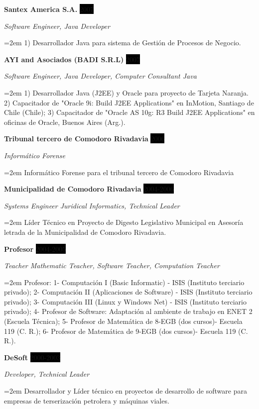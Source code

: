 \documentclass[paper=a4,fontsize=11pt]{scrartcl} %
\newcommand{\sepspace}{\vspace*{1em}}		%
\newcommand{\EducationEntry}[4]{
		\noindent \textbf{#1} \hfill      %
		\colorbox{Black}{%
			\parbox{6em}{%
			\hfill\color{White}#2}} \par  %
		\noindent \textit{#3} \par        %
		\noindent\hangindent=2em\hangafter=0 \small #4 %
		\normalsize \par}
\newcommand{\WorkEntry}[4]{				  %
		\noindent \textbf{#1} \hfill      %
		\colorbox{Black}{\color{White}#2} \par  %
		\noindent \textit{#3} \par              %
		\noindent\hangindent=2em\hangafter=0 \small #4 %
		\normalsize \par}
\begin{document}
\sepspace

\WorkEntry{Santex America S.A.}{2007}{Software Engineer, Java Developer}
{1) Desarrollador Java para sistema de Gestión de Procesos de Negocio.}

\sepspace

\WorkEntry{AYI and Asociados (BADI S.R.L)}{2007}{Software Engineer, Java Developer, Computer Consultant Java}
{1) Desarrollador Java (J2EE) y Oracle para proyecto de Tarjeta Naranja.
2) Capacitador de "Oracle 9i: Build J2EE Applications" en InMotion, Santiago de Chile (Chile);
3) Capacitador de "Oracle AS 10g: R3 Build J2EE Applications" en oficinas de Oracle, Buenos Aires (Arg.).
}

\sepspace

\WorkEntry{Tribunal tercero de Comodoro Rivadavia}{2006}{Informático Forense}{
Informático Forense para el tribunal tercero de Comodoro Rivadavia}

\sepspace

\WorkEntry{Municipalidad de Comodoro Rivadavia}{2004-2006}{Systems Engineer Juridical Informatics, Technical Leader}
{Líder Técnico en Proyecto de Digesto Legislativo Municipal en Asesoría letrada de la Municipalidad de Comodoro Rivadavia.}

\sepspace

\WorkEntry{Profesor}{2004-2005}{Teacher Mathematic Teacher, Software Teacher, Computation Teacher}
{Profesor: 
1- Computación I (Basic Informatic) - ISIS (Instituto terciario privado); 
2- Computación II (Aplicaciones de Software) - ISIS (Instituto terciario privado); 
3- Computación III (Linux y Windows Net) - ISIS (Instituto terciario privado); 
4- Profesor de Software: Adaptación al ambiente de trabajo en ENET 2 (Escuela Técnica); 
5- Profesor de Matemática de 8-EGB  (dos cursos)- Escuela 119 (C. R.); 
6- Profesor de Matemática de 9-EGB (dos cursos)- Escuela 119 (C. R.).
}

\sepspace

\WorkEntry{DeSoft}{2000-2003}{Developer, Technical Leader}{
Desarrollador y Líder técnico en proyectos de desarrollo de software para empresas de terserización petrolera y máquinas viales.}
\end{document}
